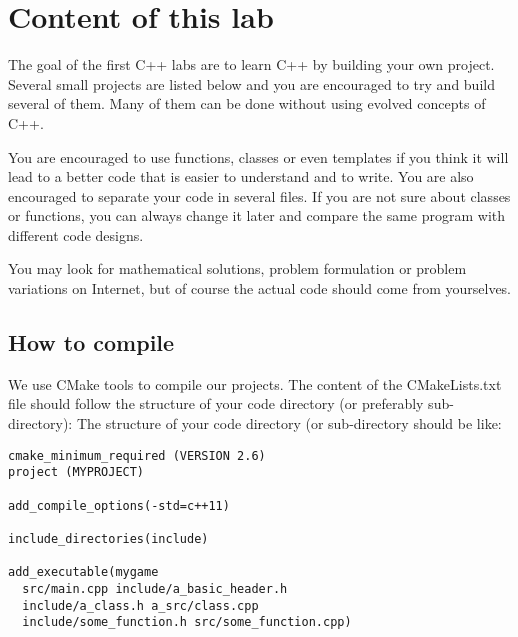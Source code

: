 \documentclass{ecnreport}
\begin{document}



\section{Content of this lab}

The goal of the first C++ labs are to learn C++ by building your own project.
Several small projects are listed below and you are encouraged to try and build several of them. Many of them can be done without using evolved concepts of C++.

You are encouraged to use functions, classes or even templates if you think it will lead to a better code that is easier to understand and to write.
You are also encouraged to separate your code in several files. If you are not sure about classes or functions, you can always change it later and compare
the same program with different code designs.

You may look for mathematical solutions, problem formulation or problem variations on Internet, but of course the actual code should come from yourselves.

\subsection{How to compile}

We use CMake tools to compile our projects.
The content of the CMakeLists.txt file should follow the structure of your code directory (or preferably sub-directory):
The structure of your code directory (or sub-directory should be like:
\begin{center}
\begin{minipage}{.4\linewidth}
\end{minipage}
\begin{minipage}{.5\linewidth}\cppstyle
\begin{lstlisting}
cmake_minimum_required (VERSION 2.6)
project (MYPROJECT)

add_compile_options(-std=c++11)

include_directories(include)

add_executable(mygame 
  src/main.cpp include/a_basic_header.h
  include/a_class.h a_src/class.cpp
  include/some_function.h src/some_function.cpp)
\end{lstlisting} \end{minipage}
\end{center}
\end{document}
